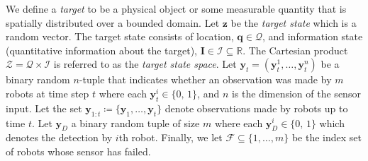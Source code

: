 \documentclass[letterpaper, 10 pt, conference]{ieeeconf}
\newcommand{\Ram}[1]{{\normalsize{\textbf{({\color{green}Ram:\ }#1)}}}}
\begin{document}
We define a \emph{target} to be a physical object or some measurable quantity that is spatially distributed over a bounded domain.
Let $\bm{z}$ be the \emph{target state} which is a random vector. 
The target state consists of location, $\bm{q} \in \mathcal{Q}$, and information state (quantitative information about the target), $\bm{I} \in \mathcal{I} \subseteq \mathbb{R}$.
The Cartesian product $\mathcal{Z} = \mathcal{Q} \times \mathcal{I}$ is referred to as the \emph{target state space}.
Let $\bm{y}_{t}=(\bm{y}_{t}^{1},\dots,\bm{y}_{t}^{n})$ be a binary random $n$-tuple that indicates whether an observation was made by $m$ robots at time step $t$ where each $\bm{y}_{t}^{i} \in \lbrace 0,\,1 \rbrace$, and $n$ is the dimension of the sensor input.
Let the set $\bm{y}_{1:t}\coloneqq \lbrace \bm{y}_1,\dots,\bm{y}_t \rbrace$ denote observations made by robots up to time $t$. Let $\bm{y}_{D}$ a binary random tuple of size $m$ where each $\bm{y}_{D}^i \in \lbrace 0,\,1 \rbrace$ which denotes the detection by $i$th robot.
Finally, we let $\mathcal{F} \subseteq \lbrace 1,\dots,m \rbrace$ be the index set of robots whose sensor has failed.

\end{document}
